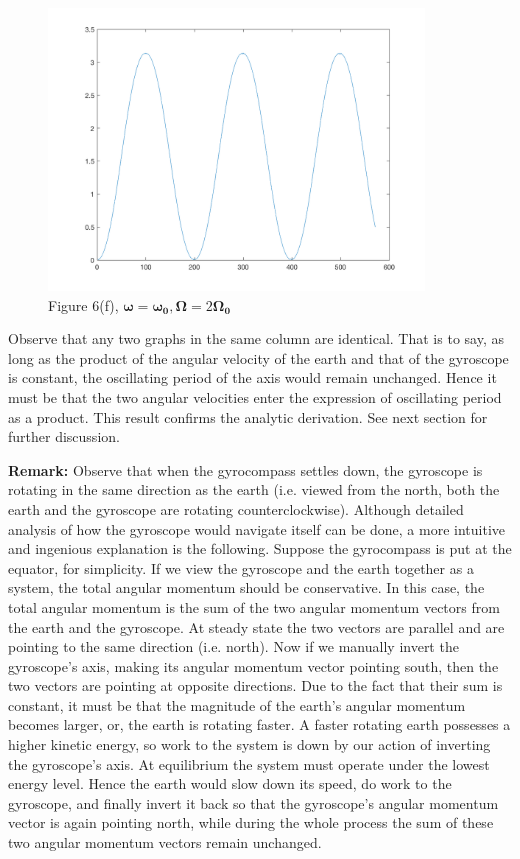 \documentclass[12pt]{article}
\renewcommand{\(}{\left (}
\renewcommand{\)}{\right )}
\renewcommand{\vec}[1]{\boldsymbol{#1}}
\begin{document}
\begin{figure}[ht]
\begin{minipage}{0.33\textwidth}
		\includegraphics[width=0.89\textwidth]{E2000.png}
		\caption*{\small Figure 6(f), $\vec{\omega} = \vec{\omega_0}, \vec{\Omega} = {2}\vec{\Omega_0}$}
	\end{minipage}
\end{figure}


Observe that any two graphs in the same column are identical. That is to say, as long as the product of the angular velocity of the earth and that of the gyroscope is constant, the oscillating period of the axis would remain unchanged. Hence it must be that the two angular velocities enter the expression of oscillating period as a product. This result confirms the analytic derivation. See next section for further discussion.

\textbf{Remark:} Observe that when the gyrocompass settles down, the gyroscope is rotating in the same direction as the earth (i.e. viewed from the north, both the earth and the gyroscope are rotating counterclockwise). Although detailed analysis of how the gyroscope would navigate itself can be done, a more intuitive and ingenious explanation is the following. Suppose the gyrocompass is put at the equator, for simplicity. If we view the gyroscope and the earth together as a system, the total angular momentum should be conservative. In this case, the total angular momentum is the sum of the two angular momentum vectors from the earth and the gyroscope. At steady state the two vectors are parallel and are pointing to the same direction (i.e. north). Now if we manually invert the gyroscope's axis, making its angular momentum vector pointing south, then the two vectors are pointing at opposite directions. Due to the fact that their sum is constant, it must be that the magnitude of the earth's angular momentum becomes larger, or, the earth is rotating faster. A faster rotating earth possesses a higher kinetic energy, so work to the system is down by our action of inverting the gyroscope's axis. At equilibrium the system must operate under the lowest energy level. Hence the earth would slow down its speed, do work to the gyroscope, and finally invert it back so that the gyroscope's angular momentum vector is again pointing north, while during the whole process the sum of these two angular momentum vectors remain unchanged.
\end{document}
